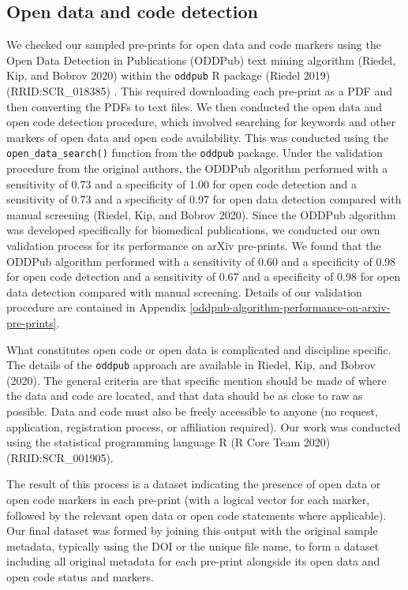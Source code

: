 \documentclass[
]{article}
\begin{document}
\hypertarget{open-data-and-code-detection}{%
\subsection{Open data and code detection}\label{open-data-and-code-detection}}

We checked our sampled pre-prints for open data and code markers using the Open Data Detection in Publications (ODDPub) text mining algorithm (Riedel, Kip, and Bobrov 2020) within the \texttt{oddpub} R package (Riedel 2019) (RRID:SCR\_018385) . This required downloading each pre-print as a PDF and then converting the PDFs to text files.
We then conducted the open data and open code detection procedure, which involved searching for keywords and other markers of open data and open code availability. This was conducted using the \texttt{open\_data\_search()} function from the \texttt{oddpub} package. Under the validation procedure from the original authors, the ODDPub algorithm performed with a sensitivity of 0.73 and a specificity of 1.00 for open code detection and a sensitivity of 0.73 and a specificity of 0.97 for open data detection compared with manual screening (Riedel, Kip, and Bobrov 2020). Since the ODDPub algorithm was developed specifically for biomedical publications, we conducted our own validation process for its performance on arXiv pre-prints. We found that the ODDPub algorithm performed with a sensitivity of 0.60 and a specificity of 0.98 for open code detection and a sensitivity of 0.67 and a specificity of 0.98 for open data detection compared with manual screening. Details of our validation procedure are contained in Appendix \ref{oddpub-algorithm-performance-on-arxiv-pre-prints}.

What constitutes open code or open data is complicated and discipline specific. The details of the \texttt{oddpub} approach are available in Riedel, Kip, and Bobrov (2020). The general criteria are that specific mention should be made of where the data and code are located, and that data should be as close to raw as possible. Data and code must also be freely accessible to anyone (no request, application, registration process, or affiliation required). Our work was conducted using the statistical programming language R (R Core Team 2020) (RRID:SCR\_001905).

The result of this process is a dataset indicating the presence of open data or open code markers in each pre-print (with a logical vector for each marker, followed by the relevant open data or open code statements where applicable). Our final dataset was formed by joining this output with the original sample metadata, typically using the DOI or the unique file name, to form a dataset including all original metadata for each pre-print alongside its open data and open code status and markers.
\end{document}
